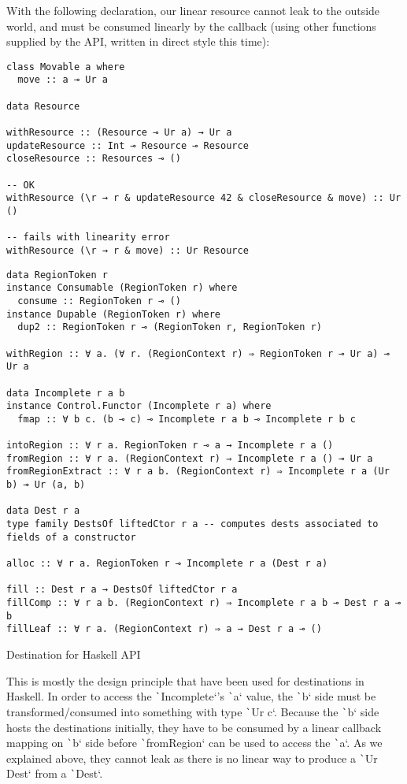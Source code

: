 \documentclass[english]{jflart}
\begin{document}
With the following declaration, our linear resource cannot leak to the outside world, and must be consumed linearly by the callback (using other functions supplied by the API, written in direct style this time):
{\small
\begin{verbatim}
class Movable a where
  move :: a ⊸ Ur a

data Resource

withResource :: (Resource ⊸ Ur a) → Ur a
updateResource :: Int ⊸ Resource ⊸ Resource
closeResource :: Resources ⊸ ()

-- OK
withResource (\r → r & updateResource 42 & closeResource & move) :: Ur ()

-- fails with linearity error
withResource (\r → r & move) :: Ur Resource
\end{verbatim}
}

\begin{table}[t]
\small
\begin{verbatim}
data RegionToken r
instance Consumable (RegionToken r) where
  consume :: RegionToken r ⊸ ()
instance Dupable (RegionToken r) where
  dup2 :: RegionToken r ⊸ (RegionToken r, RegionToken r)

withRegion :: ∀ a. (∀ r. (RegionContext r) ⇒ RegionToken r ⊸ Ur a) ⊸ Ur a

data Incomplete r a b
instance Control.Functor (Incomplete r a) where
  fmap :: ∀ b c. (b ⊸ c) ⊸ Incomplete r a b ⊸ Incomplete r b c

intoRegion :: ∀ r a. RegionToken r ⊸ a → Incomplete r a ()
fromRegion :: ∀ r a. (RegionContext r) ⇒ Incomplete r a () ⊸ Ur a
fromRegionExtract :: ∀ r a b. (RegionContext r) ⇒ Incomplete r a (Ur b) ⊸ Ur (a, b)

data Dest r a
type family DestsOf liftedCtor r a -- computes dests associated to fields of a constructor

alloc :: ∀ r a. RegionToken r ⊸ Incomplete r a (Dest r a)

fill :: Dest r a → DestsOf liftedCtor r a
fillComp :: ∀ r a b. (RegionContext r) ⇒ Incomplete r a b ⊸ Dest r a ⊸ b
fillLeaf :: ∀ r a. (RegionContext r) ⇒ a → Dest r a ⊸ ()
\end{verbatim}
\caption{Destination for Haskell API}
\label{table:destination-api}
\end{table}

This is mostly the design principle that have been used for destinations in Haskell. In order to access the \texttt`Incomplete`'s \texttt`a` value, the \texttt`b` side must be transformed/consumed into something with type \texttt`Ur c`. Because the \texttt`b` side hosts the destinations initially, they have to be consumed by a linear callback mapping on \texttt`b` side before \texttt`fromRegion` can be used to access the \texttt`a`. As we explained above, they cannot leak as there is no linear way to produce a \texttt`Ur Dest` from a \texttt`Dest`.
\end{document}

